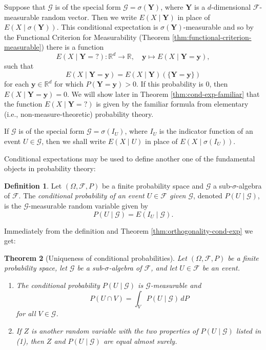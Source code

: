 \documentclass[11pt]{book}
\newtheorem{thm}{Theorem}[section]
\theoremstyle{definition}
\newtheorem{defn}[thm]{Definition}
\numberwithin{equation}{section}
\begin{document}
Suppose that $\mathcal{G}$ is of the special form $\mathcal{G} = \sigma(\mathbf{Y})$, where $\mathbf{Y}$ is a $d$-dimensional $\mathcal{F}$-measurable random vector. Then we write $E(X \mid \mathbf{Y})$ in place of $E(X\mid \sigma(\mathbf{Y}))$. This conditional expectation is $\sigma(\mathbf{Y})$-measurable and so by the Functional Criterion for Measurability (Theorem \ref{thm:functional-criterion-measurable}) there is a function
\begin{equation}\label{eq:cond-exp-func}
	E(X \mid \mathbf{Y} = {?}) :\mathbb{R}^d \to \mathbb{R}, \quad \mathbf{y} \mapsto E(X \mid \mathbf{Y} = \mathbf{y}),
\end{equation}
such that
\[
	E(X \mid \mathbf{Y} = \mathbf{y}) = E(X \mid \mathbf{Y})(\{ \mathbf{Y} = \mathbf{y} \})
\]
for each $\mathbf{y} \in \mathbb{R}^d$ for which $P(\mathbf{Y} = \mathbf{y})>0$. If this probability is $0$, then $E(X\mid \mathbf{Y}=\mathbf{y})=0$. We will show later in Theorem \ref{thm:cond-exp-familiar} that the function $E(X\mid \mathbf{Y} = {?})$ is given by the familiar formula from elementary (i.e., non-measure-theoretic) probability theory.

If $\mathcal{G}$ is of the special form $\mathcal{G} = \sigma(I_U)$, where $I_U$ is the indicator function of an event $U\in \mathcal{G}$, then we shall write $E(X \mid U)$ in place of $E(X \mid \sigma(I_U))$.

Conditional expectations may be used to define another one of the fundamental objects in probability theory:

\begin{defn}
	Let $(\Omega, \mathcal{F}, P)$ be a finite probability space and $\mathcal{G}$ a sub-$\sigma$-algebra of $\mathcal{F}$. The \textit{conditional probability of an event $U\in \mathcal{F}$ given $\mathcal{G}$}, denoted $P(U \mid \mathcal{G})$, is the $\mathcal{G}$-measurable random variable given by
	\[
		P(U \mid \mathcal{G}) = E(I_U \mid \mathcal{G}).
	\]
\end{defn}

Immediately from the definition and Theorem \ref{thm:orthogonality-cond-exp} we get:

\begin{thm}[Uniqueness of conditional probabilities]\label{thm:orthogonality-cond-prop}
	Let $(\Omega, \mathcal{F}, P)$ be a finite probability space, let $\mathcal{G}$ be a sub-$\sigma$-algebra of $\mathcal{F}$, and let $U\in \mathcal{F}$ be an event.
	\begin{enumerate}
		\item The conditional probability $P(U\mid \mathcal{G})$ is $\mathcal{G}$-measurable and
		      \[
			      P(U\cap V) = \int_V P(U\mid \mathcal{G}) \, dP
		      \]
		      for all $V\in \mathcal{G}$.
		\item If $Z$ is another random variable with the two properties of $P(U\mid \mathcal{G})$ listed in (1), then $Z$ and $P(U\mid \mathcal{G})$ are equal almost surely.
	\end{enumerate}
\end{thm}
\end{document}
